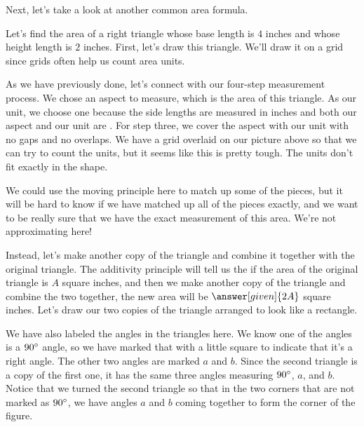 \documentclass{ximera}
\begin{document}
Next, let's take a look at another common area formula.
\begin{example}
Let's find the area of a right triangle whose base length is $4$ inches and whose height length is $2$ inches. First, let's draw this triangle. We'll draw it on a grid since grids often help us count area units.
\begin{image}\end{image}
As we have previously done, let's connect with our four-step measurement process. We chose an aspect to measure, which is the area of this triangle. As our unit, we choose one  because the side lengths are measured in inches and both our aspect and our unit are . For step three, we cover the aspect with our unit with no gaps and no overlaps. We have a grid overlaid on our picture above so that we can try to count the units, but it seems like this is pretty tough. The units don't fit exactly in the shape. 

We could use the moving principle here to match up some of the pieces, but it will be hard to know if we have matched up all of the pieces exactly, and we want to be really sure that we have the exact measurement of this area. We're not approximating here!

Instead, let's  make another copy of the triangle and combine it together with the original triangle. The additivity principle will tell us the if the area of the original triangle is $A$ square inches, and then we make another copy of the triangle and combine the two together, the new area will be $\answer[given]{2A}$ square inches. Let's draw our two copies of the triangle arranged to look like a rectangle.
\begin{image}\end{image}
We have also labeled the angles in the triangles here. We know one of the angles is a $90\degree$ angle, so we have marked that with a little square to indicate that it's a right angle. The other two angles are marked $a$ and $b$. Since the second triangle is a copy of the first one, it has the same three angles measuring $90\degree$, $a$, and $b$. Notice that we turned the second triangle so that in the two corners that are not marked as $90\degree$, we have angles $a$ and $b$ coming together to form the corner of the figure.


\end{example}
\end{document}
